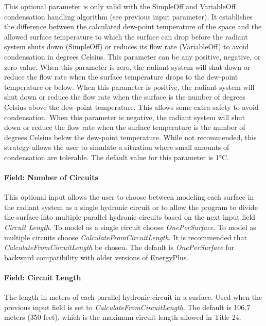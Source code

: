 This optional parameter is only valid with the SimpleOff and VariableOff condensation handling algorithm (see previous input parameter). It establishes the difference between the calculated dew-point temperature of the space and the allowed surface temperature to which the surface can drop before the radiant system shuts down (SimpleOff) or reduces its flow rate (VariableOff) to avoid condensation in degrees Celsius. This parameter can be any positive, negative, or zero value. When this parameter is zero, the radiant system will shut down or reduce the flow rate when the surface temperature drops to the dew-point temperature or below. When this parameter is positive, the radiant system will shut down or reduce the flow rate when the surface is the number of degrees Celsius above the dew-point temperature. This allows some extra safety to avoid condensation. When this parameter is negative, the radiant system will shut down or reduce the flow rate when the surface temperature is the number of degrees Celsius below the dew-point temperature. While not recommended, this strategy allows the user to simulate a situation where small amounts of condensation are tolerable.  The default value for this parameter is 1°C.

\paragraph{Field: Number of Circuits}\label{field-number-of-circuits}

This optional input allows the user to choose between modeling each surface in the radiant system as a single hydronic circuit or to allow the program to divide the surface into multiple parallel hydronic circuits based on the next input field \emph{Circuit Length}. To model as a single circuit choose \emph{OnePerSurface}. To model as multiple circuits choose \emph{CalculateFromCircuitLength}. It is recommended that \emph{CalculateFromCircuitLength} be chosen. The default is \emph{OnePerSurface} for backward compatibility with older versions of EnergyPlus.

\paragraph{Field: Circuit Length}\label{field-circuit-length}

The length in meters of each parallel hydronic circuit in a surface. Used when the previous input field is set to \emph{CalculateFromCircuitLength}. The default is 106.7 meters (350 feet), which is the maximum circuit length allowed in Title 24.

